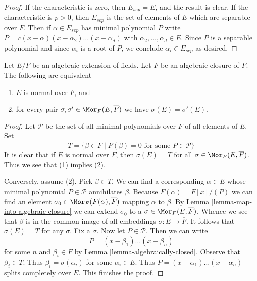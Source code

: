 \begin{proof}
If the characteristic is zero, then $E_{sep} = E$, and the result
is clear. If the characteristic is $p > 0$, then $E_{sep}$
is the set of elements of $E$ which are separable over $F$.
Then if $\alpha \in E_{sep}$ has minimal polynomial $P$
write $P = c(x - \alpha)(x - \alpha_2) \ldots (x - \alpha_d)$
with $\alpha_2, \ldots, \alpha_d \in E$. Since
$P$ is a separable polynomial and since $\alpha_i$
is a root of $P$, we conclude $\alpha_i \in E_{sep}$ as desired.
\end{proof}

\begin{lemma}
\label{lemma-characterize-normal}
Let $E/F$ be an algebraic extension of fields. Let $\overline{F}$ be an
algebraic closure of $F$. The following are equivalent
\begin{enumerate}
\item $E$ is normal over $F$, and
\item for every pair $\sigma, \sigma' \in \Mor_F(E, \overline{F})$ we
have $\sigma(E) = \sigma'(E)$.
\end{enumerate}
\end{lemma}

\begin{proof}
Let $\mathcal{P}$ be the set of all minimal polynomials over $F$ of
all elements of $E$. Set
$$
T =
\{\beta \in \overline{F} \mid P(\beta) = 0\text{ for some }P \in \mathcal{P}\}
$$
It is clear that if $E$ is normal over $F$, then $\sigma(E) = T$
for all $\sigma \in \Mor_F(E, \overline{F})$. Thus we see that (1)
implies (2).

\medskip\noindent
Conversely, assume (2). Pick $\beta \in T$.
We can find a corresponding $\alpha \in E$ whose minimal polynomial
$P \in \mathcal{P}$ annihilates $\beta$. Because $F(\alpha) = F[x]/(P)$
we can find an element $\sigma_0 \in \Mor_F(F(\alpha), \overline{F})$ mapping
$\alpha$ to $\beta$. By Lemma \ref{lemma-map-into-algebraic-closure}
we can extend $\sigma_0$ to a $\sigma \in \Mor_F(E, \overline{F})$.
Whence we see that $\beta$ is in the common image of all embeddings
$\sigma : E \to \overline{F}$. It follows that $\sigma(E) = T$
for any $\sigma$. Fix a $\sigma$. Now let $P \in \mathcal{P}$. Then we
can write
$$
P = (x - \beta_1) \ldots (x - \beta_n)
$$
for some $n$ and $\beta_i \in \overline{F}$ by
Lemma \ref{lemma-algebraically-closed}. Observe that $\beta_i \in T$.
Thus $\beta_i = \sigma(\alpha_i)$ for some $\alpha_i \in E$. Thus
$P = (x - \alpha_1) \ldots (x - \alpha_n)$ splits completely over $E$.
This finishes the proof.
\end{proof}

